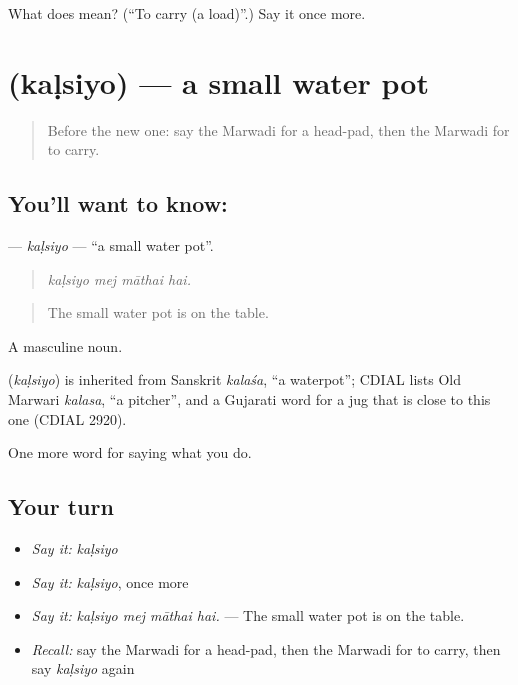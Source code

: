 \begin{tcolorbox}[breakable,colback=teal!4,colframe=teal!35!black,title={Before you move on}]
What does  mean? (\textquotedblleft{}To carry (a load)\textquotedblright{}.) Say it once more.
\end{tcolorbox}
\section[\texorpdfstring{\mw{कळसियो} (kaḷsiyo)}{कळसियो (kaḷsiyo)}]{ (kaḷsiyo) — a small water pot}

\label{lesson:MW-C175-kalsiyo}



\begin{quote}
Before the new one: say the Marwadi for a head-pad, then the Marwadi for to carry.
\end{quote}

\subsection*{You'll want to know: }
\textbf{} — \emph{kaḷsiyo} — \textquotedblleft{}a small water pot\textquotedblright{}.

\begin{quote}
   
\end{quote}

\begin{quote}
\emph{kaḷsiyo mej māthai hai.}
\end{quote}

\begin{quote}
The small water pot is on the table.
\end{quote}

A masculine noun.

\begin{cousinweb}
\textbf{} (\emph{kaḷsiyo}) is inherited from Sanskrit \emph{kalaśa}, \textquotedblleft{}a waterpot\textquotedblright{}; CDIAL lists Old Marwari \emph{kalasa}, \textquotedblleft{}a pitcher\textquotedblright{}, and a Gujarati word for a jug that is close to this one (CDIAL 2920).
\end{cousinweb}

\begin{grammarlens}[title={What you've built}]
One more word for saying what you do.
\end{grammarlens}

\subsection*{Your turn}
\begin{itemize}
\raggedright
  \item \emph{Say it:} \emph{kaḷsiyo}
  \item \emph{Say it:} \emph{kaḷsiyo}, once more
  \item \emph{Say it:} \emph{kaḷsiyo mej māthai hai.} — The small water pot is on the table.
  \item \emph{Recall:} say the Marwadi for a head-pad, then the Marwadi for to carry, then say \emph{kaḷsiyo} again
\end{itemize}

